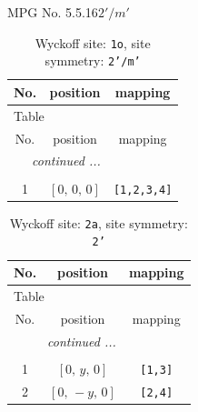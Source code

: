 \documentclass[fleqn,8pt]{jsarticle}
\begin{document}
\setcounter{MaxMatrixCols}{32}

\renewcommand{\tablename}{Table~}
\renewcommand{\figurename}{Figure~}
\begin{center}
\LARGE
MPG No. 5.5.16\quad$2'/m'$
\end{center}
\renewcommand{\arraystretch}{1.2}
\begin{longtable}{ccc}
\caption{Wyckoff site: {\tt 1o}, site symmetry: {\tt 2'/m'}}
 \\
 \hline \hline
No. & position & mapping \\ \hline \endfirsthead

\multicolumn{2}{l}{\tablename\ \thetable{}} \\
 \hline \hline
No. & position & mapping \\ \hline \endhead

 \hline \hline
\multicolumn{2}{r}{\footnotesize\it continued ...} \\ \endfoot

 \hline \hline
\multicolumn{2}{r}{} \\ \endlastfoot

1 & $\left[ 0,\, 0,\, 0 \right]$ & {\tt [1,2,3,4]} \\
\end{longtable}
\renewcommand{\arraystretch}{1.2}
\begin{longtable}{ccc}
\caption{Wyckoff site: {\tt 2a}, site symmetry: {\tt 2'}}
 \\
 \hline \hline
No. & position & mapping \\ \hline \endfirsthead

\multicolumn{2}{l}{\tablename\ \thetable{}} \\
 \hline \hline
No. & position & mapping \\ \hline \endhead

 \hline \hline
\multicolumn{2}{r}{\footnotesize\it continued ...} \\ \endfoot

 \hline \hline
\multicolumn{2}{r}{} \\ \endlastfoot

1 & $\left[ 0,\, y,\, 0 \right]$ & {\tt [1,3]} \\ \hline
2 & $\left[ 0,\, - y,\, 0 \right]$ & {\tt [2,4]} \\
\end{longtable}
\renewcommand{\arraystretch}{1.2}
\end{document}
